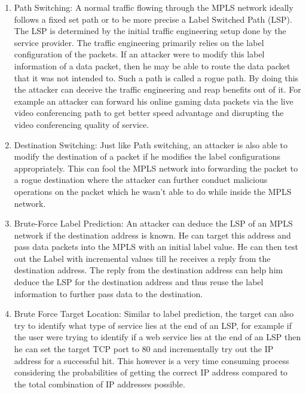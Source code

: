 \begin{enumerate}
\item Path Switching:
A normal traffic flowing through the MPLS network ideally follows a fixed set path or to be more precise a Label Switched Path (LSP). The LSP is determined by the initial traffic engineering setup done by the service provider. The traffic engineering primarily relies on the label configuration of the packets. If an attacker were to modify this label information of a data packet, then he may be able to route the data packet that it was not intended to. Such a path is called a rogue path. By doing this the attacker can deceive the traffic engineering and reap benefits out of it. For example
an attacker can forward his online gaming data packets via the live video conferencing path to get better speed advantage and disrupting the video conferencing quality of service.

\item Destination Switching:
Just like Path switching, an attacker is also able to modify the destination of a packet if he modifies the label configurations appropriately. This can fool the MPLS network into forwarding the packet to a rogue destination where the attacker can further conduct malicious operations on the packet which he wasn't able to do while inside the MPLS network.

\item Brute-Force Label Prediction:
An attacker can deduce the LSP of an MPLS network if the destination address is known. He can target this address and pass data packets into the MPLS with an initial label value. He can then test out the Label with incremental values till he receives a reply from the destination address. The reply from the destination address can help him deduce the LSP for the destination address and thus reuse the label information to further pass data to the destination. 

\item Brute Force Target Location:
Similar to label prediction, the target can also try to identify what type of service lies at the end of an LSP, for example if the user were trying to identify if a web service lies at the end of an LSP then he can set the target TCP port to 80 and incrementally try out the IP address for a successful hit. This however is a very time consuming process considering the probabilities of getting the correct IP address compared to the total combination of IP addresses possible.


\end{enumerate}
